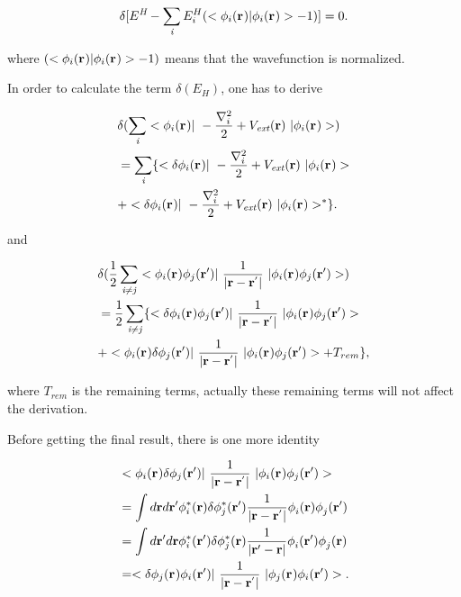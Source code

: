 \documentclass[a4paper, 12pt, titlepage,oneside,drop]{kthesis}
\begin{document}
\begin{equation}\label{haa}
 \delta [ E^{\textit{H}} - \sumi<i> E_{i}^{H} (<\bwff<i><> | \bwff<i><> > -1)] = 0. 
\end{equation}

where $(<\bwff<i><> | \bwff<i><> > -1)$ means that the wavefunction is normalized.

In order to calculate the term $\delta ( E_{\textit{H}} ) $, one has to derive

\begin{equation}\begin{split}\label{hartree1}
& \delta ( \sumi<i> <\bwff<i><> |\ -\frac{\nabla^{2}_{ i}}{2} + V_\textit{ext}(\textbf{r})  \ | \bwff<i><> > ) \\
&  = \sumi<i> \{ < \delta \bwff<i><> |\ -\frac{\nabla^{2}_{i}}{2} + V_\textit{ext}(\textbf{r})  \ | \bwff<i><> >  \\
&  + <  \delta \bwff<i><> |\ -\frac{\nabla^{2}_{i}}{2} + V_\textit{ext}(\textbf{r})  \ |  \bwff<i><> >^{\ast} \}.
\end{split}\end{equation}

and 

\begin{equation}\begin{split}\label{hartree2}
&  \delta( \frac{1}{2} \suminj<i><j> <\bwff<i><> \bwfn<j><'>|\ \frac{1}{|\textbf{r} - \textbf{r}^{'} |} \ | \bwff<i><> \bwfn<j><'>>)   \\
& =   \frac{1}{2} \suminj<i><j> \{  <\delta \bwff<i><> \bwfn<j><'>|\ \frac{1}{|\textbf{r} - \textbf{r}^{'} |} \ | \bwff<i><> \bwfn<j><'>>  \\
& +   < \bwff<i><> \delta \bwfn<j><'>|\ \frac{1}{|\textbf{r} - \textbf{r}^{'} |} \ | \bwff<i><> \bwfn<j><'>> +  T_{rem}\},
\end{split}\end{equation}

where $T_{rem}$ is the remaining terms, actually these remaining terms will not affect the derivation.

Before getting the final result, there is one more identity 

\begin{equation}\begin{split}\label{hartreelabel1}
& < \bwff<i><> \delta \bwfn<j><'>|\ \frac{1}{|\textbf{r} - \textbf{r}^{'} |} \ | \bwff<i><> \bwfn<j><'>> \\
& = \int d \textbf{r} d \textbf{r}{'}  \phi_{i}^{*} (\textbf{r}{}) \delta \phi_{j}^{*} (\textbf{r}{'}) \frac{1}{|\textbf{r} - \textbf{r}^{'} |}  \phi_{i}^{} (\textbf{r}{})  \phi_{j}^{} (\textbf{r}{'})\\
& = \int d \textbf{r}{'} d \textbf{r}  \phi_{i}^{*} (\textbf{r}{'}) \delta \phi_{j}^{*} (\textbf{r}{}) \frac{1}{|\textbf{r}{'} - \textbf{r} |}  \phi_{i}^{} (\textbf{r}{'})  \phi_{j}^{} (\textbf{r})\\
& = <\delta \bwff<j><> \bwfn<i><'>|\ \frac{1}{|\textbf{r} - \textbf{r}^{'} |} \ | \bwff<j><> \bwfn<i><'>>.
\end{split}\end{equation}
\end{document}
